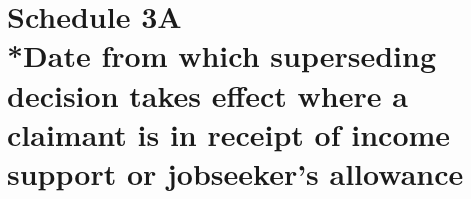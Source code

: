\documentclass[12pt,a4paper]{article}
\begin{document}
%
%
%
%
%
%
%
%
%
%
%
%
%

\part[Schedule 3A --- Date 
from which superseding decision takes effect  %
where a claimant is in receipt of income support or jobseeker’s allowance]{Schedule 3A\\*Date 
from which superseding decision takes effect  %
where a claimant is in receipt of income support or jobseeker’s allowance}
\end{document}

